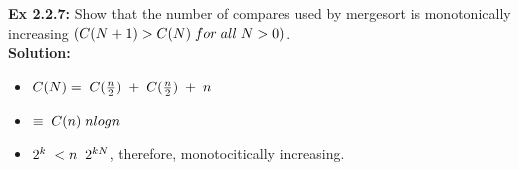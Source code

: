 \documentclass[11pt,fleqn]{article}
\begin{document}
\textbf{Ex 2.2.7:} Show that the number of compares used by mergesort is monotonically increasing
$(C(N+1) > C(N) \thickspace for \thickspace all \thickspace N > 0)$.\\

\textbf{Solution:}\\
\begin{itemize}
	\item $C(N)= \thickspace C(\frac{n}{2}) \thickspace + \thickspace C(\frac{n}{2}) \thickspace + \thickspace n$
	\item $\equiv \thickspace C(n) \thickspace nlogn$
	\item $2^k \thickspace < n \thickspace \thickspace 2^{kN}$, therefore, monotocitically increasing.
\end{itemize}
\end{document}
